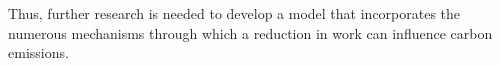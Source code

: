 \documentclass[letter, 12pt, epsf,leqno]{article}
\begin{document}



Thus, further research is needed to develop a model that incorporates the numerous mechanisms through which a reduction in work can influence carbon emissions.


\newpage


\end{document}

